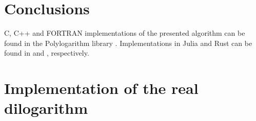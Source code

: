 \documentclass[10pt,DIV16,twocolumn,numbers=noenddot]{scrartcl}
\begin{document}
\section{Conclusions}

C, C++ and FORTRAN implementations of the presented algorithm can be
found in the Polylogarithm library \cite{polylogarithm}.
Implementations in Julia and Rust can be found in \cite{PolyLog.jl}
and \cite{polylog}, respectively.

\appendix

\section{Implementation of the real dilogarithm}






\end{document}
